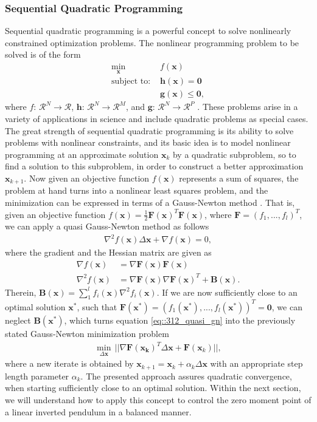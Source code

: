 \subsubsection{Sequential Quadratic Programming}
\label{sec::312_sqp}
Sequential quadratic programming is a powerful concept to solve nonlinearly constrained optimization problems. The nonlinear programming problem to be solved is of the form
\begin{align}
	\min_{\bm{x}}\, &f(\bm{x})\\
	\text{subject to: } &\bm{h}(\bm{x}) = \bm{0}\\
	&\bm{g}(\bm{x}) \leq \bm{0},
\end{align}
where $f:\,\mathcal{R}^N\rightarrow\mathcal{R}$, $\bm{h}:\,\mathcal{R}^N\rightarrow\mathcal{R}^M$, and $\bm{g}:\,\mathcal{R}^N\rightarrow\mathcal{R}^P$ \cite{boggs1995sequential}. These problems arise in a variety of applications in science and include quadratic problems as special cases. The great strength of sequential quadratic programming is its ability to solve problems with nonlinear constraints, and its basic idea is to model nonlinear programming at an approximate solution $\bm{x}_k$ by a quadratic subproblem, so to find a solution to this subproblem, in order to construct a better approximation $\bm{x}_{k+1}$. Now given an objective function $f(\bm{x})$ represents a sum of squares, the problem at hand turns into a nonlinear least squares problem, and the minimization can be expressed in terms of a Gauss-Newton method \cite{schittkowski1988solving}. That is, given an objective function $f(\bm{x}) = \frac{1}{2}\bm{F}(\bm{x})^T\bm{F}(\bm{x})$, where $\bm{F}=\left(f_1,...,f_l\right)^T$, we can apply a quasi Gauss-Newton method as follows
\begin{align}
	\nabla^2f(\bm{x})\Delta\bm{x} + \nabla f(\bm{x}) = 0,
	\label{eq::312_quasi_gn}
\end{align}
where the gradient and the Hessian matrix are given as
\begin{align}
	\nabla f(\bm{x}) &= \nabla \bm{F}(\bm{x})\bm{F}(\bm{x}) \\
	\nabla^2 f(\bm{x}) &= \nabla \bm{F}(\bm{x})\nabla\bm{F}(\bm{x})^T + \bm{B}(\bm{x}).
\end{align}
Therein, $\bm{B}(\bm{x}) = \sum_1^lf_i(\bm{x})\nabla^2f_i(\bm{x})$. If we are now sufficiently close to an optimal solution $\bm{x}^*$, such that $\bm{F}(\bm{x}^*) = \left(f_1(\bm{x}^*),...,f_l(\bm{x}^*)\right)^T=\bm{0}$, we can neglect $\bm{B}(\bm{x^*})$, which turns equation \ref{eq::312_quasi_gn} into the previously stated Gauss-Newton minimization problem
\begin{align}
	\min_{\Delta\bm{x}}\,||\nabla\bm{F}(\bm{x_k})^T\Delta\bm{x}+\bm{F}(\bm{x}_k)||,
	\label{eq::321_gn_min}
\end{align}
where a new iterate is obtained by $\bm{x}_{k+1}=\bm{x}_k + \alpha_k\Delta \bm{x}$ with an appropriate step length parameter $\alpha_k$. The presented approach assures quadratic convergence, when starting sufficiently close to an optimal solution. Within the next section, we will understand how to apply this concept to control the zero moment point of a linear inverted pendulum in a balanced manner.
